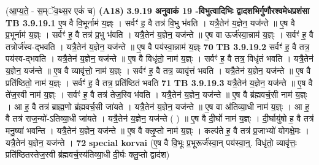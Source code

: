 \documentclass[17pt]{extarticle}
\begin{document}
{{{{{{{{{{{{{{{{{{{{{{                                    (आ॒प्य॒ते॒ - स॒म्ॅव॒थ्स॒र एकं॑ च) \textbf{(A18)} \newline \newline
                \textbf{ 3.9.19    अनुवाकं   19 -विभुत्वादिभिः द्वादशभिर्गुणौरश्वमेधप्रशंसा} \newline
                                \textbf{ TB 3.9.19.1} \newline
                  ए॒ष वै वि॒भूर्नाम॑ य॒ज्ञ्ः । सर्वꣳ॑ ह॒ वै तत्र॑ वि॒भु भ॑वति । यत्रै॒तेन॑ य॒ज्ञेन॒ यज॑न्ते ॥ ए॒ष वै प्र॒भूर्नाम॑ य॒ज्ञ्ः । सर्वꣳ॑ ह॒ वै तत्र॑ प्र॒भु भ॑वति । यत्रै॒तेन॑ य॒ज्ञेन॒ यज॑न्ते ॥ ए॒ष वा ऊर्ज॑स्वा॒न्नाम॑ य॒ज्ञ्ः । सर्वꣳ॑ ह॒ वै तत्रोर्ज॑स्व-द्भवति । यत्रै॒तेन॑ य॒ज्ञेन॒ यज॑न्ते ॥ ए॒ष वै पय॑स्वा॒न्नाम॑ य॒ज्ञ्ः \textbf{ 70} \newline
                  \newline
                                \textbf{ TB 3.9.19.2} \newline
                  सर्वꣳ॑ ह॒ वै तत्र॒ पय॑स्व-द्भवति । यत्रै॒तेन॑ य॒ज्ञेन॒ यज॑न्ते ॥ ए॒ष वै विधृ॑तो॒ नाम॑ य॒ज्ञ्ः । सर्वꣳ॑ ह॒ वै तत्र॒ विधृ॑तं भवति । यत्रै॒तेन॑ य॒ज्ञेन॒ यज॑न्ते ॥ ए॒ष वै व्यावृ॑त्तो॒ नाम॑ य॒ज्ञ्ः । सर्वꣳ॑ ह॒ वै तत्र॒ व्यावृ॑त्तं भवति । यत्रै॒तेन॑ य॒ज्ञेन॒ यज॑न्ते ॥ ए॒ष वै प्रति॑ष्ठितो॒ नाम॑ य॒ज्ञ्ः । सर्वꣳ॑ ह॒ वै तत्र॒ प्रति॑ष्ठितं भवति \textbf{ 71} \newline
                  \newline
                                \textbf{ TB 3.9.19.3} \newline
                  यत्रै॒तेन॑ य॒ज्ञेन॒ यज॑न्ते ॥ ए॒ष वै ते॑ज॒स्वी नाम॑ य॒ज्ञ्ः । सर्वꣳ॑ ह॒ वै तत्र॑ तेज॒स्वि भ॑वति । यत्रै॒तेन॑ य॒ज्ञेन॒ यज॑न्ते ॥ ए॒॒ष वै ब्र॑ह्मवर्च॒सी नाम॑ य॒ज्ञ्ः । आ ह॒ वै तत्र॑ ब्राह्म॒णो ब्र॑ह्मवर्च॒सी जा॑यते । यत्रै॒तेन॑ य॒ज्ञेन॒ यज॑न्ते ॥ ए॒ष वा अ॑तिव्या॒धी नाम॑ य॒ज्ञ्ः । आ ह॒ वै तत्र॑ राज॒न्यो॑-ऽतिव्या॒धी जा॑यते । यत्रै॒तेन॑ य॒ज्ञेन॒ यज॑न्ते ( ) ॥ ए॒ष वै दी॒र्घो नाम॑ य॒ज्ञ्ः । दी॒र्घायु॑षो ह॒ वै तत्र॑ मनु॒ष्या॑ भवन्ति । यत्रै॒तेन॑ य॒ज्ञेन॒ यज॑न्ते ॥ ए॒ष वै क्लृ॒प्तो नाम॑ य॒ज्ञ्ः । कल्प॑ते ह॒ वै तत्र॑ प्र॒जाभ्यो॑ योगक्षे॒मः । यत्रै॒तेन॑ य॒ज्ञेन॒ यज॑न्ते । \textbf{ 72} \newline
                  \newline
                                                        \textbf{special korvai} \newline
              (ए॒ष वै वि॒भूः प्र॒भूरूर्ज॑स्वा॒न् पय॑स्वा॒न्॒. विधृ॑तो॒ व्यावृ॑त्तः॒ प्रति॑ष्ठितस्तेज॒स्वी ब्र॑ह्मवर्च॒स्य॑तिव्या॒धी दी॒र्घः क्लु॒प्तो द्वाद॑श) \newline
}}}}}}}}}}}}}}}}}}}}}}
\end{document}
